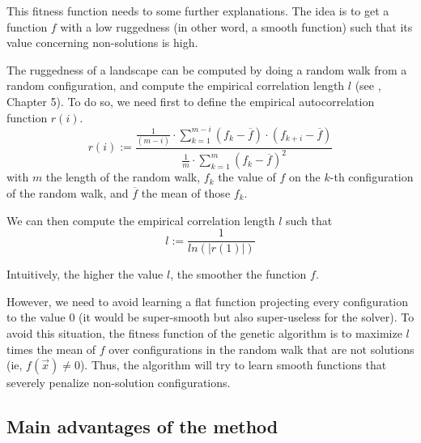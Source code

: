 \documentclass[a4paper, 12pt]{article}
\begin{document}
This fitness function needs to  some further explanations. The idea is
to get a function  $f$ with a low ruggedness (in  other word, a smooth
function) such that its value concerning non-solutions is high.

The ruggedness of  a landscape can be computed by  doing a random walk
from  a random  configuration, and  compute the  empirical correlation
length $l$ (see \cite{Hoos2005}, Chapter 5). To do so, we need first to define the
empirical autocorrelation function $r(i)$.
\begin{displaymath}
r(i)               :=\frac{\frac{1}{(m-i)}\cdot\sum\limits_{k=1}^{m-i}\left(f_{k}-\overline{f}\right)
  \cdot\left(f_{k+i}-\overline{f}\right)}{\frac{1}{m}\cdot\sum\limits_{k=1}^{m}\left(f_{k}-\overline{f}\right)^{2}}
\end{displaymath}
with $m$ the length of the random  walk, $f_k$ the value of $f$ on the
$k$-th configuration of  the random walk, and  $\overline{f}$ the mean
of those $f_k$.

We can then compute the empirical correlation length $l$ such that
\begin{displaymath}
l := \frac{1}{ln(|r(1)|)}
\end{displaymath}

Intuitively, the higher the value $l$, the smoother the function $f$.

However, we  need to avoid  learning a flat function  projecting every
configuration  to the  value  0  (it would  be  super-smooth but  also
super-useless for  the solver). To  avoid this situation,  the fitness
function of the genetic algorithm is to maximize $l$ times the mean of
$f$ over configurations in the random walk that are not solutions (ie,
$f(\vec{x}) \neq  0$). Thus,  the algorithm will  try to  learn smooth
functions that severely penalize non-solution configurations.

\subsection{Main advantages of the method}
\end{document}
